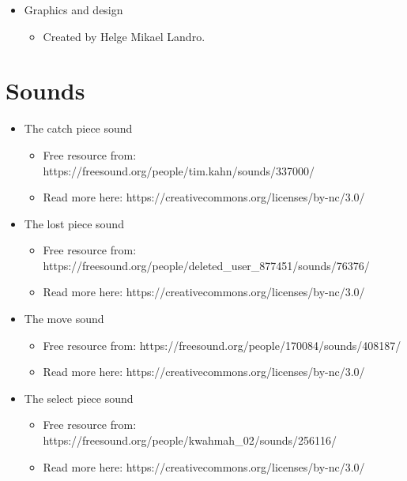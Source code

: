 \documentclass{article}
\begin{document}
\begin{itemize}
\item Graphics and design
    \begin{itemize}
        \item Created by Helge Mikael Landro.
        \end{itemize}
\end{itemize}

\section*{Sounds}
\begin{itemize}
\item The catch piece sound
    \begin{itemize}
        \item Free resource from:  https://freesound.org/people/tim.kahn/sounds/337000/
        \item Read more here: https://creativecommons.org/licenses/by-nc/3.0/
        \end{itemize}
\end{itemize}

\begin{itemize}
\item The lost piece sound
    \begin{itemize}
        \item Free resource from: https://freesound.org/people/deleted\_user\_877451/sounds/76376/
        \item Read more here: https://creativecommons.org/licenses/by-nc/3.0/
        \end{itemize}
\end{itemize}

\begin{itemize}
\item The move sound
    \begin{itemize}
        \item Free resource from:  https://freesound.org/people/170084/sounds/408187/
        \item Read more here: https://creativecommons.org/licenses/by-nc/3.0/
        \end{itemize}
\end{itemize}

\begin{itemize}
\item The select piece sound
    \begin{itemize}
        \item Free resource from: https://freesound.org/people/kwahmah\_02/sounds/256116/
        \item Read more here: https://creativecommons.org/licenses/by-nc/3.0/
        \end{itemize}
\end{itemize}
\end{document}
